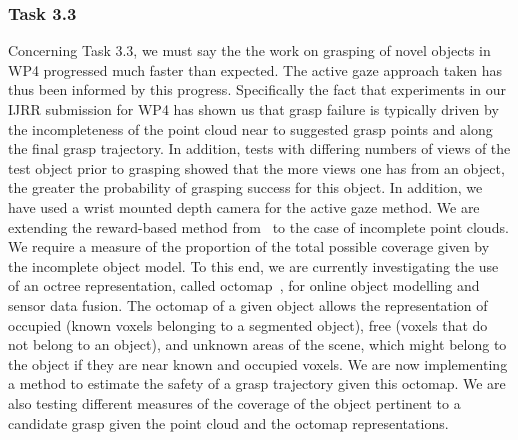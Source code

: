\documentclass[a4paper,11pt,pdf]{pacmanreport}
\begin{document}

\subsubsection{Task 3.3}

Concerning Task 3.3, we must say the the work on grasping of novel objects in WP4 progressed much faster than expected. The active gaze approach taken has thus been informed by this progress. Specifically the fact that experiments in our IJRR submission for WP4 has shown us that grasp failure is typically driven by the incompleteness of the point cloud near to suggested grasp points and along the final grasp trajectory. In addition, tests with differing numbers of views of the test object prior to grasping showed that the more views one has from an object, the greater the probability of grasping success for this object. In addition, we have used a wrist mounted depth camera for the active gaze method. We are extending the reward-based method from~\cite{nunez2013models} to the case of incomplete point clouds. We require a measure of the proportion of the total possible coverage given by the incomplete object model. To this end, we are currently investigating the use of an octree representation, called octomap~\cite{hornung13auro}, for online object modelling and sensor data fusion. The octomap of a given object allows the representation of occupied (known voxels belonging to a segmented object), free (voxels that do not belong to an object), and unknown areas of the scene, which might belong to the object if they are near known and occupied voxels. We are now implementing a method to estimate the safety of a grasp trajectory given this octomap. We are also testing different measures of the coverage of the object pertinent to a candidate grasp given the point cloud and the octomap representations.
\end{document}
